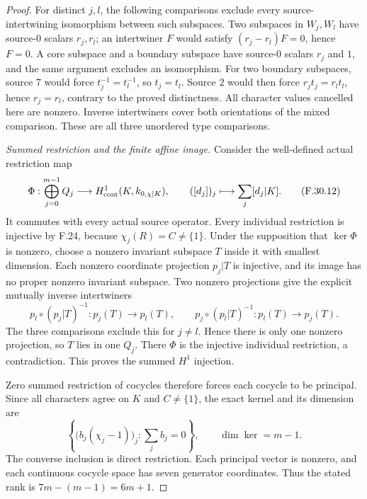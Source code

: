 \begin{proof}
For distinct $j,l$, the following comparisons
exclude every source-intertwining isomorphism
between such subspaces. Two subspaces in
$W_j,W_l$ have source-$0$ scalars $r_j,r_l$;
an intertwiner $F$ would satisfy
$(r_j-r_l)F=0$, hence $F=0$.
A core subspace and a boundary subspace
have source-$0$ scalars $r_j$ and $1$,
and the same argument excludes an isomorphism.
For two boundary subspaces, source $7$
would force $t_j^{-1}=t_l^{-1}$, so $t_j=t_l$.
Source $2$ would then force
$r_jt_j=r_lt_l$, hence $r_j=r_l$,
contrary to the proved distinctness.
All character values cancelled here are
nonzero. Inverse intertwiners cover both
orientations of the mixed comparison.
These are all three unordered type comparisons.

\emph{Summed restriction and the finite affine image.}
Consider the well-defined actual restriction map
\[
 \Phi:\bigoplus_{j=0}^{m-1}Q_j
      \longrightarrow H^1_{\rm cont}(K,k_{0,\chi|K}),
      \qquad ([d_j])_j\longmapsto\sum_j[d_j|K].
                                                               \tag{F.30.12}
\]
It commutes with every actual source operator.
Every individual restriction is injective
by F.24, because $\chi_j(R)=C\ne\{1\}$.
Under the supposition that $\ker\Phi$ is
nonzero, choose a nonzero invariant subspace
$T$ inside it with smallest dimension.
Each nonzero coordinate projection $p_j|T$
is injective, and its image has no proper
nonzero invariant subspace.
Two nonzero projections give the explicit
mutually inverse intertwiners
\[
 p_l\circ(p_j|T)^{-1}:p_j(T)\longrightarrow p_l(T),
 \qquad p_j\circ(p_l|T)^{-1}:p_l(T)\longrightarrow p_j(T).
                                                               \tag{F.30.13}
\]
The three comparisons exclude this for
$j\ne l$. Hence there is only one nonzero
projection, so $T$ lies in one $Q_j$.
There $\Phi$ is the injective individual
restriction, a contradiction.
This proves the summed $H^1$ injection.

Zero summed restriction of cocycles therefore
forces each cocycle to be principal.
Since all characters agree on $K$ and
$C\ne\{1\}$, the exact kernel and its dimension are
\[
 \left\{\bigl(b_j(\chi_j-1)\bigr)_j:
                      \sum_jb_j=0\right\},\qquad
                     \dim\ker=m-1.
                                                               \tag{F.30.14}
\]
The converse inclusion is direct restriction.
Each principal vector is nonzero, and each
continuous cocycle space has seven generator
coordinates. Thus the stated rank is
$7m-(m-1)=6m+1$.


\end{proof}
